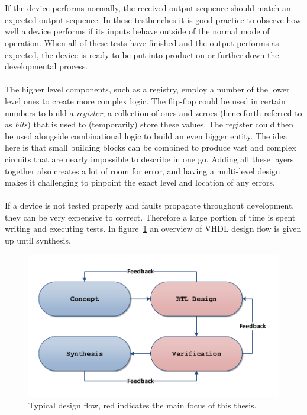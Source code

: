 \documentclass[11pt,british]{article}
\begin{document}
\\
\\
If the device performs normally, the received output sequence should match an expected output sequence. In these testbenches it is good practice to observe how well a device performs if its inputs behave outside of the normal mode of operation. When all of these tests have finished and the output performs as expected, the device is ready to be put into production or further down the developmental process.\cite{vhdldebug}
\\
\\
The higher level components, such as a registry, employ a number of the lower level ones to create more complex logic.\cite{vhdlsynth3} The flip-flop could be used in certain numbers to build a \emph{register}, a collection of ones and zeroes (henceforth referred to as \emph{bits}) that is used to (temporarily) store these values. The register could then be used alongside combinational logic to build an even bigger entity. The idea here is that small building blocks can be combined to produce vast and complex circuits that are nearly impossible to describe in one go.\cite{vhdlhierarchy} Adding all these layers together also creates a lot of room for error, and having a multi-level design makes it challenging to pinpoint the exact level and location of any errors. 
\\
\\
If a device is not tested properly and faults propagate throughout development, they can be very expensive to correct.\cite{weber06} Therefore a large portion of time is spent writing and executing tests. In figure~\ref{fig:Design_Flow} an overview of \gls{VHDL} design flow is given up until synthesis.
\begin{figure}[h]
    \centering
	\includegraphics[width=.7\textwidth]{images/designflow.pdf}
    \caption{Typical design flow, red indicates the main focus of this thesis.}
    \label{fig:Design_Flow}
\end{figure}
\end{document}
